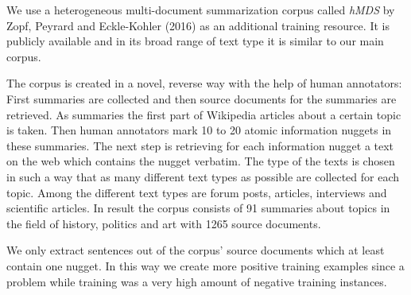 We use a heterogeneous multi-document summarization corpus called \textit{hMDS} by Zopf, Peyrard and Eckle-Kohler (2016) \citep{tubiblio97941} as an additional training resource. It is publicly available and in its broad range of text type it is similar to our main corpus.

The corpus is created in a novel, reverse way with the help of human annotators: First summaries are collected and then source documents for the summaries are retrieved. As summaries the first part of Wikipedia articles about a certain topic is taken. Then human annotators mark 10 to 20 atomic information nuggets in these summaries. The next step is retrieving for each information nugget a text on the web which contains the nugget verbatim. The type of the texts is chosen in such a way that as many different text types as possible are collected for each topic. Among the different text types are forum posts, articles, interviews and scientific articles. In result the corpus consists of 91 summaries about topics in the field of history, politics and art with 1265 source documents.

We only extract sentences out of the corpus' source documents which at least contain one nugget. In this way we create more positive training examples since a problem while training was a very high amount of negative training instances.